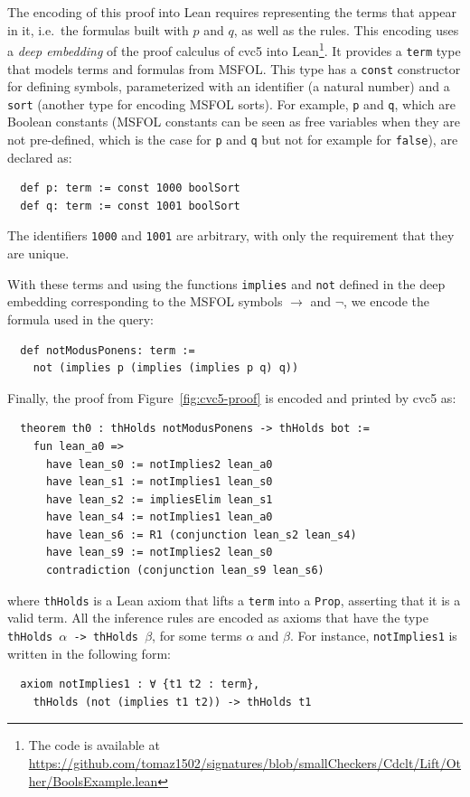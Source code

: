 The encoding of this proof into Lean requires representing the terms that appear
in it, i.e.\ the formulas built with $p$ and $q$, as well as the rules.
%
This encoding uses a \emph{deep embedding} of the proof calculus of cvc5 into
Lean\footnote{The code is available at \url{https://github.com/tomaz1502/signatures/blob/smallCheckers/Cdclt/Lift/Other/BoolsExample.lean}}.
%
It provides a \texttt{term} type that models terms and formulas from MSFOL. This type has
a \texttt{const} constructor for defining symbols, parameterized with an
identifier (a natural number) and a \texttt{sort} (another type for encoding MSFOL
sorts).
%
For example, \texttt{p} and \texttt{q}, which are Boolean constants (MSFOL
constants can be seen as free variables when they are not pre-defined, which is
the case for \texttt{p} and \texttt{q} but not for example for \texttt{false}),
are declared as:

\begin{verbatim}
  def p: term := const 1000 boolSort
  def q: term := const 1001 boolSort
\end{verbatim}

The identifiers \texttt{1000} and \texttt{1001} are arbitrary, with only the
requirement that they are unique.

With these terms and using the functions \texttt{implies} and
\texttt{not} defined in the deep embedding corresponding to the MSFOL symbols
$\rightarrow$ and $\neg$, we encode the formula used in the
query:

\begin{verbatim}
  def notModusPonens: term :=
    not (implies p (implies (implies p q) q))
\end{verbatim}

Finally, the proof from Figure~\ref{fig:cvc5-proof} is encoded and printed by cvc5 as:

\begin{verbatim}
  theorem th0 : thHolds notModusPonens -> thHolds bot :=
    fun lean_a0 =>
      have lean_s0 := notImplies2 lean_a0
      have lean_s1 := notImplies1 lean_s0
      have lean_s2 := impliesElim lean_s1
      have lean_s4 := notImplies1 lean_a0
      have lean_s6 := R1 (conjunction lean_s2 lean_s4)
      have lean_s9 := notImplies2 lean_s0
      contradiction (conjunction lean_s9 lean_s6)
\end{verbatim}

where \texttt{thHolds} is a Lean axiom that lifts a \texttt{term} into a \texttt{Prop}, asserting that it is a valid term. All the inference rules are encoded as axioms that have the type \texttt{thHolds $\alpha$ -> thHolds $\beta$}, for some terms $\alpha$ and $\beta$. For instance, \texttt{notImplies1} is written in the following form:
\begin{verbatim}
  axiom notImplies1 : ∀ {t1 t2 : term},
    thHolds (not (implies t1 t2)) -> thHolds t1
\end{verbatim}

